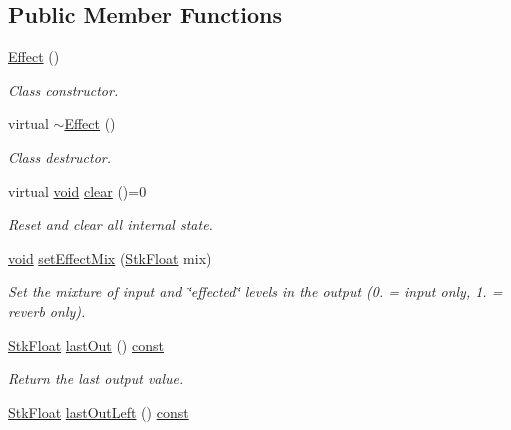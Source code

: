 \subsection*{Public Member Functions}
\begin{DoxyCompactItemize}
\item 
\hyperlink{class_nyq_1_1_effect_a4dae74244f59936a49847da9217b4126}{Effect} ()
\begin{DoxyCompactList}\small\item\em Class constructor. \end{DoxyCompactList}\item 
virtual \hyperlink{class_nyq_1_1_effect_ac26c0a394247e14c9081f875522b5b66}{$\sim$\+Effect} ()
\begin{DoxyCompactList}\small\item\em Class destructor. \end{DoxyCompactList}\item 
virtual \hyperlink{sound_8c_ae35f5844602719cf66324f4de2a658b3}{void} \hyperlink{class_nyq_1_1_effect_a556f4ecc6a31cfb91e687167e16fcc6a}{clear} ()=0
\begin{DoxyCompactList}\small\item\em Reset and clear all internal state. \end{DoxyCompactList}\item 
\hyperlink{sound_8c_ae35f5844602719cf66324f4de2a658b3}{void} \hyperlink{class_nyq_1_1_effect_a4ffed75ab6daef44ff99268423a5c421}{set\+Effect\+Mix} (\hyperlink{namespace_nyq_a044fa20a706520a617bbbf458a7db7e4}{Stk\+Float} mix)
\begin{DoxyCompactList}\small\item\em Set the mixture of input and \char`\"{}effected\char`\"{} levels in the output (0. = input only, 1. = reverb only). \end{DoxyCompactList}\item 
\hyperlink{namespace_nyq_a044fa20a706520a617bbbf458a7db7e4}{Stk\+Float} \hyperlink{class_nyq_1_1_effect_a8bee89fc973aa1b8943ae2af6047433a}{last\+Out} () \hyperlink{getopt1_8c_a2c212835823e3c54a8ab6d95c652660e}{const} 
\begin{DoxyCompactList}\small\item\em Return the last output value. \end{DoxyCompactList}\item 
\hyperlink{namespace_nyq_a044fa20a706520a617bbbf458a7db7e4}{Stk\+Float} \hyperlink{class_nyq_1_1_effect_a80411e87fd45bed771f722b94b2bad37}{last\+Out\+Left} () \hyperlink{getopt1_8c_a2c212835823e3c54a8ab6d95c652660e}{const} 

\end{DoxyCompactItemize}
